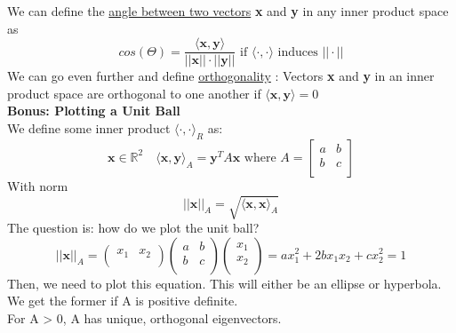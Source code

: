 \documentclass[12pt]{article}
\begin{document}
We can define the \underline{angle between two vectors} \textbf{x} and \textbf{y} in any inner product space as 
\begin{equation*}
    cos(\Theta) = \frac{\langle \mathbf{x}, \mathbf{y} \rangle}{||\mathbf{x}||\cdot||\mathbf{y}|| } \text{ if } \langle \cdot,\cdot \rangle \text{ induces } ||\cdot||
\end{equation*}
\newline
We can go even further and define \underline{orthogonality} : Vectors \textbf{x} and \textbf{y} in an inner product space are orthogonal to one another if $\langle \mathbf{x},\mathbf{y} \rangle=0$ \\
\color{ForestGreen}
\large{\textbf{Bonus: Plotting a Unit Ball}}
\color{Black}\\
We define some inner product $\langle \cdot , \cdot \rangle_R$ as:
\begin{equation*}
    \mathbf{x} \in \mathbb{R}^2 \quad \langle \mathbf{x},\mathbf{y} \rangle_A = \mathbf{y}^T A \mathbf{x} \text{ where } A=
    \begin{bmatrix}
        a & b \\
        b & c \\
    \end{bmatrix}    
\end{equation*}
With norm 
\begin{equation*}
    ||\mathbf{x}||_A = \sqrt{\langle\mathbf{x},\mathbf{x}\rangle_A}
\end{equation*}
The question is: how do we plot the unit ball? 
\begin{equation*}
    ||\mathbf{x}||_A = 
    \begin{pmatrix}
        x_1 & x_2 \\
    \end{pmatrix}
    \begin{pmatrix}
        a & b \\
        b & c \\
    \end{pmatrix}
    \begin{pmatrix}
        x_1 \\
        x_2 \\
    \end{pmatrix}
    = ax_1^2 + 2bx_1x_2 + cx_2^2 = 1
\end{equation*}
Then, we need to plot this equation. This will either be an ellipse or hyperbola. We get the former if A is positive definite. \\
For A > 0, A has unique, orthogonal eigenvectors. \\
\end{document}
